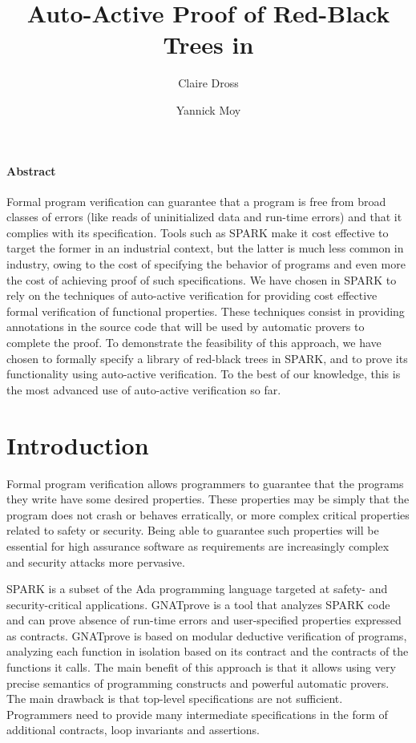 \documentclass{llncs}
\title{Auto-Active Proof of Red-Black Trees in \spark}
\author{Claire Dross \and Yannick Moy}
\institute{AdaCore, F-75009 Paris}
\date{}
\newcommand{\spark}{SPARK\xspace}
\begin{document}
\sloppy
{}
\maketitle

\paragraph{Abstract}
Formal program verification can guarantee that a program is free from broad
classes of errors (like reads of uninitialized data and run-time errors) and
that it complies with its specification. Tools such as \spark make it cost
effective to target the former in an industrial context, but the latter is much
less common in industry, owing to the cost of specifying the behavior of
programs and even more the cost of achieving proof of such specifications. We
have chosen in \spark to rely on the techniques of auto-active verification for
providing cost effective formal verification of functional properties. These
techniques consist in providing annotations in the source code that will be
used by automatic provers to complete the proof. To demonstrate
the feasibility of this approach, we have chosen to formally specify a library
of red-black trees in \spark, and to prove its functionality using auto-active
verification. To the best of our knowledge, this is the most advanced use of
auto-active verification so far.


\section{Introduction}

Formal program verification allows programmers to guarantee that the programs
they write have some desired properties. These properties may be simply that
the program does not crash or behaves erratically, or more complex critical
properties related to safety or security. Being able to guarantee such
properties will be essential for high assurance software as requirements are
increasingly complex and security attacks more pervasive.

SPARK is a subset of the Ada programming language targeted at safety- and
security-critical applications. GNATprove is a tool that analyzes SPARK code
and can prove absence of run-time errors and user-specified properties
expressed as contracts. GNATprove is based on modular deductive verification of
programs, analyzing each function in isolation based on its contract and the
contracts of the functions it calls. The main benefit of this approach is that
it allows using very precise semantics of programming constructs and powerful
automatic provers. The main drawback is that top-level specifications are not
sufficient. Programmers need to provide many intermediate specifications in the
form of additional contracts, loop invariants and assertions.
\end{document}
